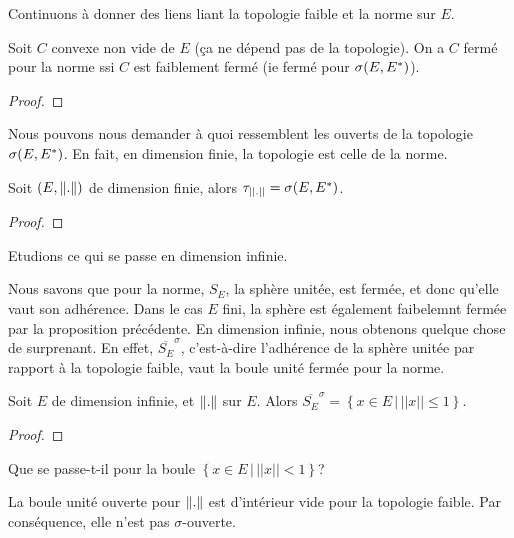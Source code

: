 Continuons à donner des liens liant la topologie faible et la norme sur $E$.

\begin{proposition}
	Soit $C$ convexe non vide de $E$ (ça ne dépend pas de la topologie).
	On a $C$ fermé pour la norme ssi $C$ est faiblement fermé (ie fermé pour
	$\sigma(E, E^{*})$).
\end{proposition}

\ifdefined\outputproof
\begin{proof}

\end{proof}
\fi

Nous pouvons nous demander à quoi ressemblent les ouverts de la topologie
$\sigma(E, E^{*})$. En fait, en dimension finie, la topologie est celle de la norme.

\begin{proposition}
	Soit $(E, \norm{.})$ de dimension finie, alors $\tau_{||.||}
	= \sigma(E, E^{*})$.
\end{proposition}

\ifdefined\outputproof
\begin{proof}

\end{proof}
\fi

Etudions ce qui se passe en dimension infinie.

Nous savons que pour la norme, $S_{E}$, la sphère unitée, est fermée, et donc
qu'elle vaut son adhérence.  Dans le cas $E$ fini, la sphère est également
faibelemnt fermée par la proposition précédente. En dimension infinie, nous
obtenons quelque chose de surprenant. En effet, $\overline{S_{E}}^{\sigma}$,
c'est-à-dire l'adhérence de la sphère unitée par rapport à la topologie faible,
vaut la boule unité fermée pour la norme.

\begin{proposition}
	Soit $E$ de dimension infinie, et $\norm{.}$ sur $E$. Alors
	$\overline{S_{E}}^{\sigma} = \left\{ x \in E \, | \, ||x|| \leq 1 \right\}$.
\end{proposition}

\ifdefined\outputproof
\begin{proof}

\end{proof}
\fi

Que se passe-t-il pour la boule $\left\{ x \in E \, | \, ||x|| < 1 \right\}$?

\begin{proposition}
	La boule unité ouverte pour $\norm{.}$ est d'intérieur vide pour la
	topologie faible. Par conséquence, elle n'est pas $\sigma$-ouverte.
\end{proposition}

